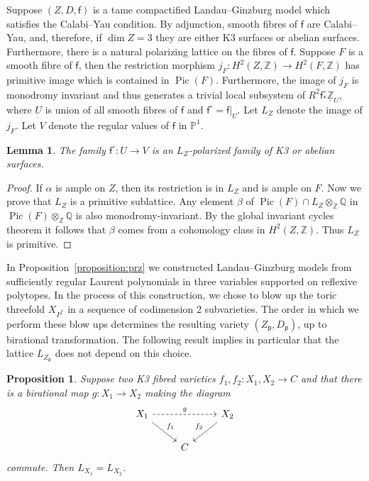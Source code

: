 \documentclass[10pt]{amsart}
\numberwithin{equation}{section}
\theoremstyle{plain}
\newtheorem{lemma}[theorem]{Lemma}
\newtheorem{proposition}[theorem]{Proposition}
\theoremstyle{definition}
\theoremstyle{remark}
\DeclareMathOperator{\Pic}{Pic}
\begin{document}
Suppose \((Z,D,\mathsf{f})\) is a tame compactified Landau--Ginzburg model which satisfies the Calabi--Yau condition. By adjunction, smooth fibres of \(\mathsf{f}\) are Calabi--Yau, and, therefore, if \(\dim Z = 3\) they are either K3 surfaces or abelian surfaces. Furthermore, there is a natural polarizing lattice on the fibres of \(\mathsf{f}\). Suppose \(F\) is a smooth fibre of \(\mathsf{f}\), then the restriction morphism \(j_F: H^2(Z,\mathbb{Z})\rightarrow H^2(F,\mathbb{Z})\) has primitive image which is contained in \(\Pic(F)\). Furthermore, the image of \(j_F\) is monodromy invariant and thus generates a trivial local subsystem of \(R^2\mathsf{f}^\circ_*\underline{\mathbb{Z}}_{U}\), where \(U\) is union of all smooth fibres of \(\mathsf{f}\) and \(\mathsf{f}^\circ = \mathsf{f}|_U\). Let \(L_Z\) denote the image of \(j_F\). Let \(V\) denote the regular values of \(\mathsf{f}\) in \(\mathbb{P}^1\).

\begin{lemma}
  The family \(\mathsf{f}^\circ: U\rightarrow V\) is an \(L_Z\)-polarized family of K3 or abelian surfaces.
\end{lemma}

\begin{proof}
  If \(\alpha\) is ample on \(Z\), then its restriction is in \(L_Z\) and is ample on \(F\). Now we prove that \(L_Z\) is a primitive sublattice. Any element \(\beta\) of \(\Pic(F) \cap L_Z\otimes_\mathbb{Z}\mathbb{Q}\) in \(\Pic(F)\otimes_\mathbb{Z}\mathbb{Q}\) is also monodromy-invariant. By the global invariant cycles theorem it follows that \(\beta\) comes from a cohomology class in \(H^2(Z,\mathbb{Z})\). Thus \(L_Z\) is primitive.
\end{proof}

In Proposition~\ref{proposition:prz} we constructed Landau--Ginzburg models from sufficiently regular Laurent polynomials in three variables supported on reflexive polytopes. In the process of this construction, we chose to blow up the toric threefold \(X_{P^*}\) in a sequence of codimension 2 subvarieties. The order in which we perform these blow ups determines the resulting variety \((Z_\mathsf{p},D_\mathsf{p})\), up to birational transformation. The following result implies in particular that the lattice \(L_{Z_\mathsf{p}}\) does not depend on this choice.

\begin{proposition}
  Suppose two K3 fibred varieties \(f_1,f_2:X_1,X_2\rightarrow C\) and that there is a birational map \(g \colon X_1\rightarrow X_2\) making the diagram
  \[
    \begin{tikzcd}
      X_1 \ar[rd,"f_1"] \ar[dashed, rr,"g"] & & X_2 \ar[ld,"f_2",swap] \\
      & C &
    \end{tikzcd}
  \]
  commute. Then \(L_{X_1} = L_{X_2}\).
\end{proposition}
\end{document}
